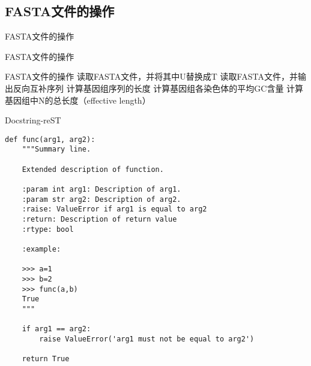 \subsection{FASTA文件的操作}
\begin{frame}[standout] FASTA文件的操作 \end{frame}
\begin{frame}{FASTA文件的操作}
    \begin{myoutline}
        \1 FASTA文件的操作
             \2 读取FASTA文件，并将其中U替换成T
             \2 读取FASTA文件，并输出反向互补序列
             \2 计算基因组序列的长度
             \2 计算基因组各染色体的平均GC含量
             \2 计算基因组中N的总长度（effective length）
    \end{myoutline}
\end{frame}


\begin{frame}[fragile]{Docstring-reST}
    \tiny
    \begin{lstlisting}
def func(arg1, arg2):
    """Summary line.

    Extended description of function.

    :param int arg1: Description of arg1.
    :param str arg2: Description of arg2.
    :raise: ValueError if arg1 is equal to arg2
    :return: Description of return value
    :rtype: bool

    :example:

    >>> a=1
    >>> b=2
    >>> func(a,b)
    True
    """

    if arg1 == arg2:
        raise ValueError('arg1 must not be equal to arg2')

    return True
    \end{lstlisting}
\end{frame}

